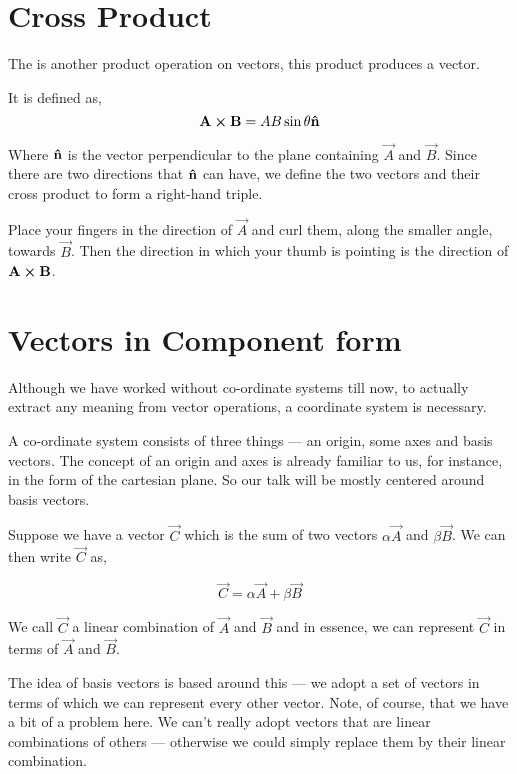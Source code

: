 \section{Cross Product}

The  is another product operation on vectors, this product produces a vector.

It is defined as, 
\[\vec{A} \cp \vec{B} = AB\sin\theta \unitv{n}\] 

Where \(\boldsymbol{\mathbf{\hat{n}}}\) is the vector perpendicular to the plane containing \(\vec{A}\) and \(\vec{B}\).
Since there are two directions that \(\boldsymbol{\mathbf{\hat{n}}}\) can have, we define the two vectors 
and their cross product to form a right-hand triple.

Place your fingers in the direction of \(\vec{A}\) and curl them, along the smaller angle, towards 
\(\vec{B}\). Then the direction in which your thumb is pointing is the direction of \(\vec{A} \cp \vec{B}\). 

\section{Vectors in Component form}

Although we have worked without co-ordinate systems till now,
to actually extract any meaning from vector operations, a coordinate system is necessary.

A co-ordinate system consists of three things --- an origin, some axes and basis vectors.
The concept of an origin and axes is already familiar to us, for instance, in the form of the cartesian plane.
So our talk will be mostly centered around basis vectors. 

Suppose we have a vector \(\vec{C}\) which is the sum of two vectors \(\alpha\vec{A}\) and 
\(\beta\vec{B}\). We can then write \(\vec{C}\) as,

\begin{equation*}
    \vec{C} = \alpha\vec{A} + \beta\vec{B}
\end{equation*}

We call \(\vec{C}\) a linear combination of \(\vec{A}\) and \(\vec{B}\) and in essence, 
we can represent \(\vec{C}\) in terms of \(\vec{A}\) and \(\vec{B}\). 

The idea of basis vectors is based around this --- we adopt a set of vectors in terms 
of which we can represent every other vector. Note, of course, that we have 
a bit of a problem here. We can't really adopt vectors that are linear combinations of 
others --- otherwise we could simply replace them by their linear combination.

